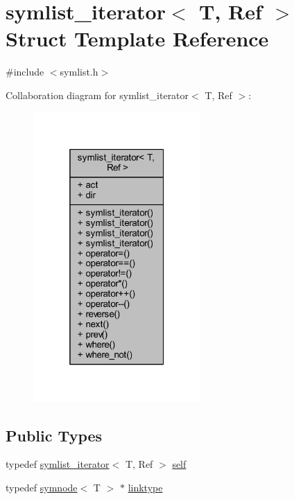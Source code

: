 \hypertarget{structsymlist__iterator}{}\section{symlist\+\_\+iterator$<$ T, Ref $>$ Struct Template Reference}
\label{structsymlist__iterator}


{\ttfamily \#include $<$symlist.\+h$>$}



Collaboration diagram for symlist\+\_\+iterator$<$ T, Ref $>$\+:\nopagebreak
\begin{figure}[H]
\begin{center}
\leavevmode
\includegraphics[width=181pt]{structsymlist__iterator__coll__graph}
\end{center}
\end{figure}
\subsection*{Public Types}
\begin{DoxyCompactItemize}
\item 
typedef \mbox{\hyperlink{structsymlist__iterator}{symlist\+\_\+iterator}}$<$ T, Ref $>$ \mbox{\hyperlink{structsymlist__iterator_ae1426e0085d4c88445c0a84675ee7d38}{self}}
\item 
typedef \mbox{\hyperlink{structsymnode}{symnode}}$<$ T $>$ $\ast$ \mbox{\hyperlink{structsymlist__iterator_ad9462ba519f8ca01ea64e04e25ee3750}{linktype}}
\end{DoxyCompactItemize}
